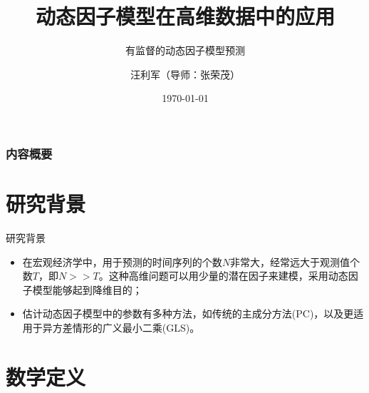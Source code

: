 \documentclass{beamer}
\title[动态因子模型在高维数据中的应用]{
  \xiaoerhao 动态因子模型在高维数据中的应用}
\subtitle{\sihao\cjkhwxk 有监督的动态因子模型预测}
\author[汪利军]{
  汪利军（导师：张荣茂）}
\institute[\xiaosihao\fontspec{LHANDW.TTF}Zhejiang University]{\sihao {数学科学学院}}
\date[\today]{
  \today \\
  }
\begin{document}
\begin{frame}
  \titlepage
\end{frame}




\begin{frame}
  \frametitle{内容概要}

  \tableofcontents
\end{frame}


\section{研究背景}
\begin{frame}{研究背景}
	\begin{itemize}
		\setlength\itemsep{1.2em}
		\item 	在宏观经济学中，用于预测的时间序列的个数$N$非常大，经常远大于观测值个数$T$，即$N >> T$。这种高维问题可以用少量的潜在因子来建模，采用动态因子模型能够起到降维目的\parencite{stock2002forecasting}；
		\item 估计动态因子模型中的参数有多种方法，如传统的主成分方法(PC)\parencite{stock2002forecasting}，以及更适用于异方差情形的广义最小二乘(GLS)\parencite{breitung2011gls}。
	\end{itemize}
\end{frame}

\section{数学定义}
\end{document}
